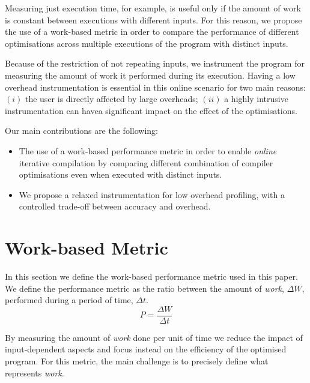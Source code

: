 \documentclass[sigplan,9pt]{acmart}
\newcommand{\itercomp}{{iterative compilation}}
\begin{document}
Measuring just execution time, for example, is useful only if the amount of work is constant between executions with different inputs.
For this reason, we propose the use of a work-based metric in order to compare the performance of different optimisations across multiple executions of the program with distinct inputs.

Because of the restriction of not repeating inputs, we instrument the program for measuring the amount of work it performed during its execution.
Having a low overhead instrumentation is essential in this online scenario for two main reasons:
$(i)$ the user is directly affected by large overheads;
$(ii)$ a highly intrusive instrumentation can havea significant impact on the effect of the optimisations.

Our main contributions are the following:
\begin{itemize}
\item The use of a work-based performance metric in order to enable \textit{online} {\itercomp} by comparing different combination of compiler optimisations even when executed with distinct inputs.
\item We propose a relaxed instrumentation for low overhead profiling, with a controlled trade-off between accuracy and overhead.
\end{itemize}

\section{Work-based Metric} \label{sec:metric}

In this section we define the work-based performance metric used in this paper.
We define the performance metric as the ratio between the amount of \textit{work}, $\Delta W$, performed during a period of time, $\Delta t$.
\[
   P = \frac{\Delta W}{\Delta t}
\]

By measuring the amount of \textit{work} done per unit of time we reduce the impact of input-dependent aspects and focus instead on the efficiency of the optimised program.
For this metric, the main challenge is to precisely define what represents \textit{work}.

\end{document}
